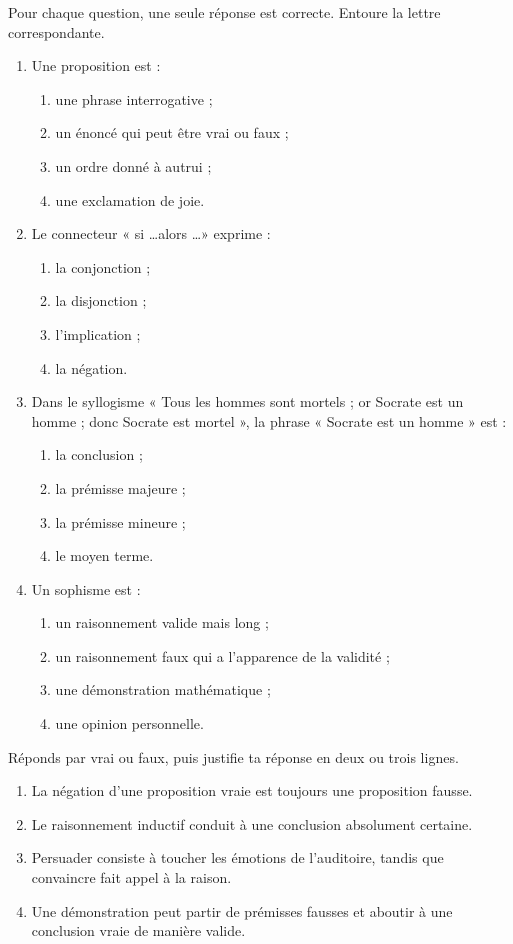 \documentclass[11pt]{article}
\newcommand{\cle}[1]{{\popxbold\color{popdark}#1}}
\begin{document}
\begin{exercice}
Pour chaque question, une seule réponse est correcte. Entoure la lettre correspondante.
\begin{enumerate}
\item Une \cle{proposition} est :
\begin{enumerate}
\item une phrase interrogative ;
\item un énoncé qui peut être vrai ou faux ;
\item un ordre donné à autrui ;
\item une exclamation de joie.
\end{enumerate}
\item Le connecteur « si \ldots alors \ldots » exprime :
\begin{enumerate}
\item la conjonction ; \item la disjonction ; \item l'implication ; \item la négation.
\end{enumerate}
\item Dans le syllogisme « Tous les hommes sont mortels ; or Socrate est un homme ; donc Socrate est mortel », la phrase « Socrate est un homme » est :
\begin{enumerate}
\item la conclusion ; \item la prémisse majeure ; \item la prémisse mineure ; \item le moyen terme.
\end{enumerate}
\item Un \cle{sophisme} est :
\begin{enumerate}
\item un raisonnement valide mais long ;
\item un raisonnement faux qui a l'apparence de la validité ;
\item une démonstration mathématique ;
\item une opinion personnelle.
\end{enumerate}
\end{enumerate}
\end{exercice}

\begin{exercice}
Réponds par vrai ou faux, puis justifie ta réponse en deux ou trois lignes.
\begin{enumerate}
\item La négation d'une proposition vraie est toujours une proposition fausse.
\item Le raisonnement inductif conduit à une conclusion absolument certaine.
\item Persuader consiste à toucher les émotions de l'auditoire, tandis que convaincre fait appel à la raison.
\item Une démonstration peut partir de prémisses fausses et aboutir à une conclusion vraie de manière valide.
\end{enumerate}
\end{exercice}
\end{document}
